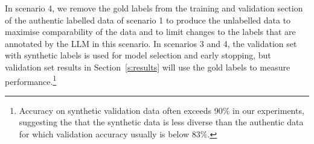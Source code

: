 In scenario 4, we remove the gold labels from the training and validation section of the authentic labelled data of scenario 1 to produce the unlabelled data
to maximise comparability of the data and to limit changes to the labels that are
annotated by the LLM in this scenario.
%
In scenarios 3 and 4, the validation set with synthetic labels is used for model selection and early stopping, but validation set results in Section~\ref{s:results} will use the gold labels
to measure performance.\footnote{Accuracy
    on synthetic validation data often exceeds 90\% in our experiments,
    suggesting the that the synthetic data is less diverse than
    the authentic data for which validation accuracy usually is
    below 83\%.
}

%

